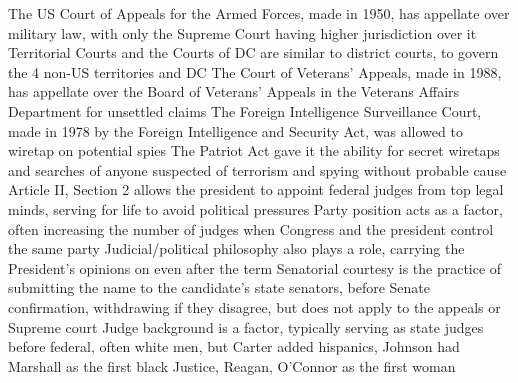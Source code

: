 \documentclass[11 pt, twoside]{article}
\newenvironment{outline*}
{
	\begin{outline}[enumerate]
	}
	{\end{outline}
}
\begin{document}
\begin{outline*}
\1 The US Court of Appeals for the Armed Forces, made in 1950, has appellate over military law, with only the Supreme Court having higher jurisdiction over it
\1 Territorial Courts and the Courts of DC are similar to district courts, to govern the 4 non-US territories and DC
\1 The Court of Veterans’ Appeals, made in 1988, has appellate over the Board of Veterans’ Appeals in the Veterans Affairs Department for unsettled claims
\1 The Foreign Intelligence Surveillance Court, made in 1978 by the Foreign Intelligence and Security Act, was allowed to wiretap on potential spies
\2 The Patriot Act gave it the ability for secret wiretaps and searches of anyone suspected of terrorism and spying without probable cause
\1 Article II, Section 2 allows the president to appoint federal judges from top legal minds, serving for life to avoid political pressures
\2 Party position acts as a factor, often increasing the number of judges when Congress and the president control the same party
\2 Judicial/political philosophy also plays a role, carrying the President’s opinions on even after the term
\2 Senatorial courtesy is the practice of submitting the name to the candidate’s state senators, before Senate confirmation, withdrawing if they disagree, but does not apply to the appeals or Supreme court
\2 Judge background is a factor, typically serving as state judges before federal, often white men, but Carter added hispanics, Johnson had Marshall as the first black Justice, Reagan, O’Connor as the first woman
\end{outline*}
\end{document}
